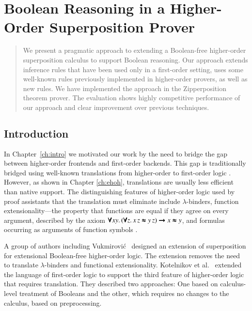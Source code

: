 \chapter{Boolean Reasoning in a Higher-Order Superposition Prover}
\label{ch:bools}




\begin{abstract}
    We present a pragmatic approach to extending a Boolean-free higher-order
    superposition calculus to support Boolean reasoning. Our approach extends
    inference rules that have been used only in a first-order setting, uses some
    well-known rules previously implemented in higher-order provers, as well as new rules.
    We have implemented the approach in the Zipperposition
    theorem prover. The evaluation shows highly competitive performance of our approach
    and clear improvement over previous techniques.
\end{abstract}

\newpage

\section{Introduction} 
\label{sect:bool:introduction}

In Chapter~\ref{ch:intro} we motivated our work by the need to bridge the gap
between higher-order frontends and first-order backends. This gap is
traditionally bridged using well-known translations from higher-order to
first-order logic \cite{ar-70-hol, mp-08-trans}. However, as shown in Chapter
\ref{ch:ehoh}, translations are usually less efficient than native support. The
distinguishing features of higher-order logic used by proof assistants that the
translation must eliminate include $\lambda$-binders, function
extensionality---the property that functions are equal if they agree on every
argument, described by the axiom $\pmb{\forall} xy. \allowbreak\, (\pmb{\forall} z. \, x
\, z \pmb{\approx} y \,z) \pmb{\rightarrow} x \pmb{\approx} y$, and formulas occurring as arguments of
function symbols \cite{mp-08-trans}.

A group of authors including Vukmirovi\'c\ \cite{bbtvw-21-sup-lam} designed an
extension of superposition for extensional Boolean-free higher-order logic. The extension removes the need to translate
$\lambda$-binders and functional extensionality. Kotelnikov et al.\
\cite{kotelnikov-15-fool,kotelnikov-16-fool} extended the language of
first-order logic to support the third feature of higher-order logic that
requires translation. They described two approaches: One based on calculus-level
treatment of Booleans and the other, which requires no changes to the calculus,
based on preprocessing.

